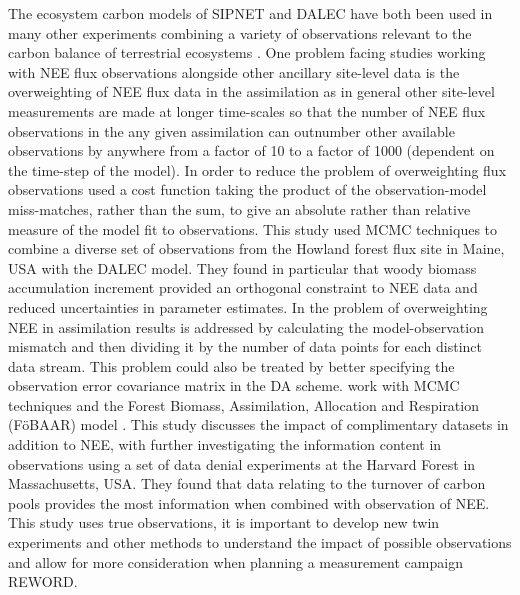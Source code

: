 \documentclass[12pt]{article}
\begin{document}
The ecosystem carbon models of SIPNET and DALEC have both been used in many other experiments combining a variety of observations relevant to the carbon balance of terrestrial ecosystems \citep{Zobitz2008, Moore20081467, Sacks2007, Keenan2011}. One problem facing studies working with NEE flux observations alongside other ancillary site-level data is the overweighting of NEE flux data in the assimilation as in general other site-level measurements are made at longer time-scales so that the number of NEE flux observations in the any given assimilation can outnumber other available observations by anywhere from a factor of 10 to a factor of 1000 (dependent on the time-step of the model). In order to reduce the problem of overweighting flux observations \citet{richardson2010estimating} used a cost function taking the product of the observation-model miss-matches, rather than the sum, to give an absolute rather than relative measure of the model fit to observations. This study used MCMC techniques to combine a diverse set of observations from the Howland forest flux site in Maine, USA with the DALEC model. They found in particular that woody biomass accumulation increment provided an orthogonal constraint to NEE data and reduced uncertainties in parameter estimates. In \citet{Keenan2012} the problem of overweighting NEE in assimilation results is addressed by calculating the model-observation mismatch and then dividing it by the number of data points for each distinct data stream. This problem could also be treated by better specifying the observation error covariance matrix in the DA scheme. \citet{Keenan2012} work with MCMC techniques and the Forest Biomass, Assimilation, Allocation and Respiration (F\"{o}BAAR) model . This study discusses the impact of complimentary datasets in addition to NEE, with \citet{Keenan2013} further investigating the information content in observations using a set of data denial experiments at the Harvard Forest in Massachusetts, USA. They found that data relating to the turnover of carbon pools provides the most information when combined with observation of NEE. This study uses true observations, it is important to develop new twin experiments and other methods to understand the impact of possible observations and allow for more consideration when planning a measurement campaign {\color{red}REWORD}.  
\end{document}
